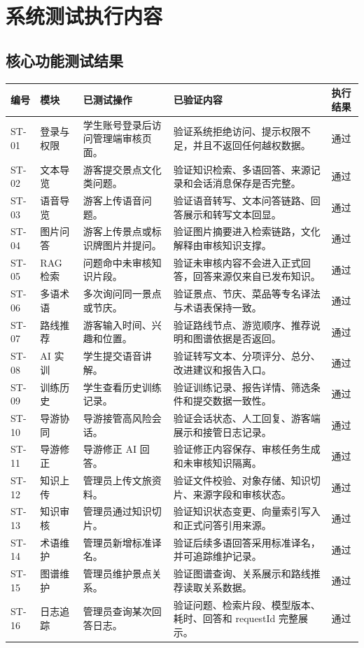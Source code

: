 \section{系统测试执行内容}

\subsection{核心功能测试结果}

\begin{longtable}{p{1.2cm}p{2.0cm}p{3.4cm}p{4.7cm}p{1.6cm}}
\toprule
编号 & 模块 & 已测试操作 & 已验证内容 & 执行结果 \\
\midrule
ST-01 & 登录与权限 & 学生账号登录后访问管理端审核页面。 & 验证系统拒绝访问、提示权限不足，并且不返回任何越权数据。 & 通过 \\
ST-02 & 文本导览 & 游客提交景点文化类问题。 & 验证知识检索、多语回答、来源记录和会话消息保存是否完整。 & 通过 \\
ST-03 & 语音导览 & 游客上传语音问题。 & 验证语音转写、文本问答链路、回答展示和转写文本回显。 & 通过 \\
ST-04 & 图片问答 & 游客上传景点或标识牌图片并提问。 & 验证图片摘要进入检索链路，文化解释由审核知识支撑。 & 通过 \\
ST-05 & RAG 检索 & 问题命中未审核知识片段。 & 验证未审核内容不会进入正式回答，回答来源仅来自已发布知识。 & 通过 \\
ST-06 & 多语术语 & 多次询问同一景点或节庆。 & 验证景点、节庆、菜品等专名译法与术语表保持一致。 & 通过 \\
ST-07 & 路线推荐 & 游客输入时间、兴趣和位置。 & 验证路线节点、游览顺序、推荐说明和图谱依据是否返回。 & 通过 \\
ST-08 & AI 实训 & 学生提交语音讲解。 & 验证转写文本、分项评分、总分、改进建议和报告入口。 & 通过 \\
ST-09 & 训练历史 & 学生查看历史训练记录。 & 验证训练记录、报告详情、筛选条件和提交数据一致性。 & 通过 \\
ST-10 & 导游协同 & 导游接管高风险会话。 & 验证会话状态、人工回复、游客端展示和接管日志记录。 &通过\\
ST-11 & 导游修正 & 导游修正 AI 回答。 & 验证修正内容保存、审核任务生成和未审核知识隔离。 &通过\\
ST-12 & 知识上传 & 管理员上传文旅资料。 & 验证文件校验、对象存储、知识切片、来源字段和审核状态。 &通过\\
ST-13 & 知识审核 & 管理员通过知识切片。 & 验证知识状态变更、向量索引写入和正式问答引用来源。 &通过\\
ST-14 & 术语维护 & 管理员新增标准译名。 & 验证后续多语回答采用标准译名，并可追踪维护记录。 &通过\\
ST-15 & 图谱维护 & 管理员维护景点关系。 & 验证图谱查询、关系展示和路线推荐读取关系数据。 &通过\\
ST-16 & 日志追踪 & 管理员查询某次回答日志。 & 验证问题、检索片段、模型版本、耗时、回答和 requestId 完整展示。 &通过\\
\bottomrule
\end{longtable}

